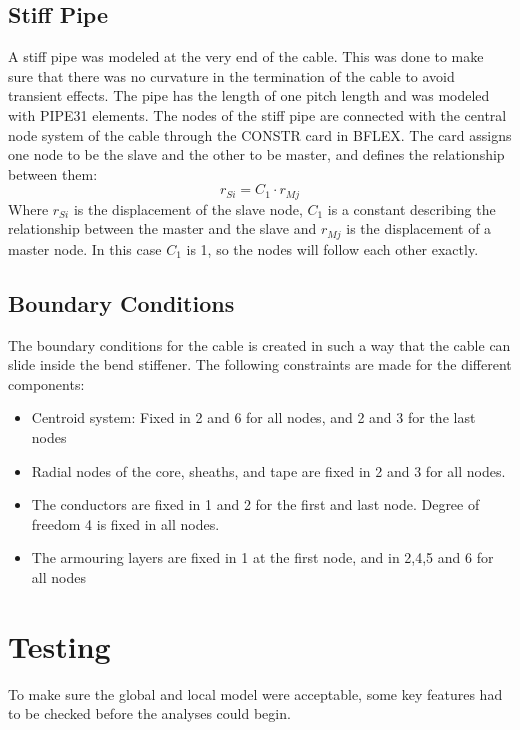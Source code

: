 \subsection{Stiff Pipe}
A stiff pipe was modeled at the very end of the cable. This was done to make sure that there was no curvature in the termination of the cable to avoid transient effects. The pipe has the length of one pitch length and was modeled with PIPE31 elements. The nodes of the stiff pipe are connected with the central node system of the cable through the CONSTR card in BFLEX. The card assigns one node to be the slave and the other to be master, and defines the relationship between them:
\begin{equation}
r_{Si}=C_1 \cdot r_{Mj}    
\end{equation}
Where $r_{Si}$ is the displacement of the slave node,  $C_1$ is a constant describing the relationship between the master and the slave and $r_{Mj}$ is the displacement of a master node.\newline 
\newline 
In this case $C_1$ is 1, so the nodes will follow each other exactly. 

\subsection{Boundary Conditions}
The boundary conditions for the cable is created in such a way that the cable can slide inside the bend stiffener. The following constraints are made for the different components:
\begin{itemize}
    \item Centroid system: Fixed in 2 and 6 for all nodes, and 2 and 3 for the last nodes
    \item Radial nodes of the core, sheaths, and tape are fixed in 2 and 3 for all nodes. 
    \item The conductors are fixed in 1 and 2 for the first and last node. Degree of freedom 4 is fixed in all nodes.
    \item The armouring layers are fixed in 1 at the first node, and in 2,4,5 and 6 for all nodes
\end{itemize}

\section {Testing}
\label{sec:localtest}
To make sure the global and local model were acceptable, some key features had to be checked before the analyses could begin. 
